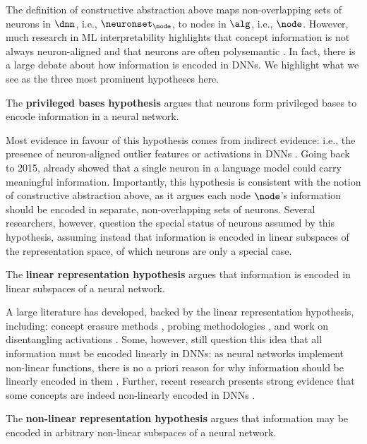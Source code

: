\documentclass{article}
\begin{document}
The definition of constructive abstraction above maps non-overlapping sets of neurons in $\dnn$, i.e., $\neuronset_{\node}$, to nodes in $\alg$, i.e., $\node$.
However, much research in ML interpretability highlights that concept information is not always neuron-aligned and that neurons are often polysemantic \citep{olah2017feature, olah2020zoom, arora-etal-2018-linear, elhage2022superposition}.
In fact, there is a large debate about how information is encoded in DNNs.
We highlight what we see as the three most prominent hypotheses here.
\begin{definition}
    The \textbf{privileged bases hypothesis} \citep{elhage2023privileged} argues that neurons form privileged bases to encode information in a neural network.
\end{definition}
Most evidence in favour of this hypothesis comes from indirect evidence: i.e., the presence of neuron-aligned outlier features or activations in DNNs \citep{kovaleva-etal-2021-bert,elhage2023privileged,he2024understanding,sun2024massive}.
Going back to 2015, \citet{karpathy2015unreasonable} already showed that a single neuron in a language model could carry meaningful information.
Importantly, this hypothesis is consistent with the notion of constructive abstraction above, as it argues each node $\node$'s information should be encoded in separate, non-overlapping sets of neurons.
Several researchers, however, question the special status of neurons assumed by this hypothesis, assuming instead that information is encoded in linear subspaces of the representation space, of which neurons are only a special case.
\begin{definition}
    The \textbf{linear representation hypothesis} \citep{alain2018understanding} argues that information is encoded in linear subspaces of a neural network.
\end{definition}
A large literature has developed, backed by the linear representation hypothesis, including: concept erasure methods \citep{ravfogel-etal-2020-null,ravfogel2022linear}, probing methodologies \citep{elazar2021amnesic,ravfogel-etal-2021-counterfactual,lasri-etal-2022-probing}, and work on disentangling activations \citep{yun-etal-2021-transformer,elhage2022superposition,huben2024sparse, templeton2024scaling}.
Some, however, still question this idea that all information must be encoded linearly in DNNs: as neural networks implement non-linear functions, there is no a priori reason for why information should be linearly encoded in them \citep{conneau-etal-2018-cram,hewitt-liang-2019-designing,pimentel-etal-2020-information,pimentel-etal-2020-pareto,pimentel-etal-2022-attentional}.
Further, recent research presents strong evidence that some concepts are indeed non-linearly encoded in DNNs \citep{white-etal-2021-non,pimentel-etal-2022-attentional,olah2024linear,Csordas2024RecurrentNN,Engels2024NotAL,engels2025decomposingdarkmattersparse,kantamneni2025languagemodelsusetrigonometry}.
\begin{definition}
    The \textbf{non-linear representation hypothesis} \citep{pimentel-etal-2020-information} argues that information may be encoded in arbitrary non-linear subspaces of a neural network.
\end{definition}
\end{document}
